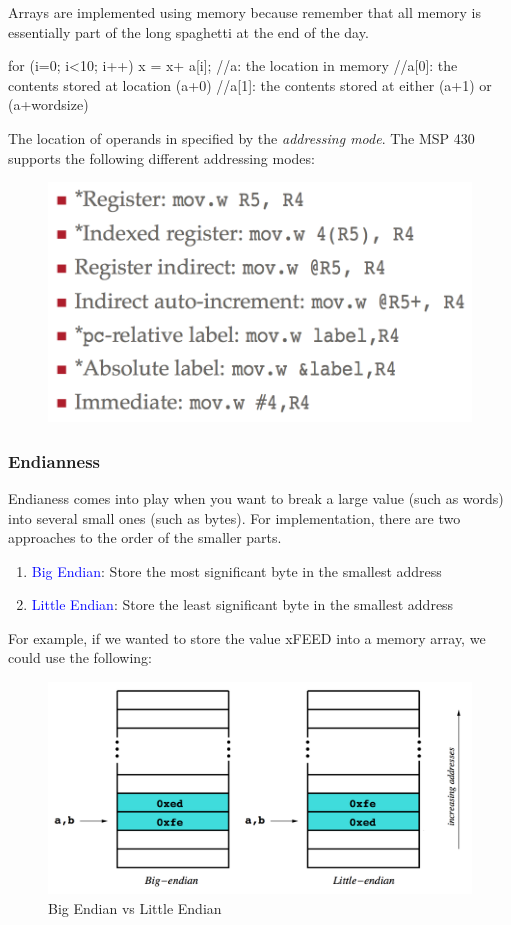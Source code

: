 \documentclass{hw}
\begin{document}
Arrays are implemented using memory because remember that all memory is essentially
part of the long spaghetti at the end of the day. 
\begin{C}
for (i=0; i<10; i++){
  x = x+ a[i];
}
//a:    the location in memory
//a[0]: the contents stored at location (a+0)
//a[1]: the contents stored at either (a+1) or (a+wordsize)
\end{C}

The location of operands in specified by the \emph{addressing mode}. The MSP 430
supports the following different addressing modes:
\begin{figure}[H]
  \includegraphics[scale=.5]{img/address}
\end{figure}

\subsubsection{Endianness}
Endianess comes into play when you want to break a large value (such as words) 
into several small ones (such as bytes). For implementation, there are two 
approaches to the order of the smaller parts. 
\begin{enumerate}
\item \textcolor{blue}{Big Endian}: Store the most significant byte in the smallest address
\item \textcolor{blue}{Little Endian}: Store the least significant byte in the 
  smallest address
\end{enumerate}
For example, if we wanted to store the value xFEED into a memory array, we could
use the following:
\begin{figure}[H]
  \centering
  \includegraphics[scale=.4]{img/endian}
  \caption{Big Endian vs Little Endian}
\end{figure}
\end{document}
